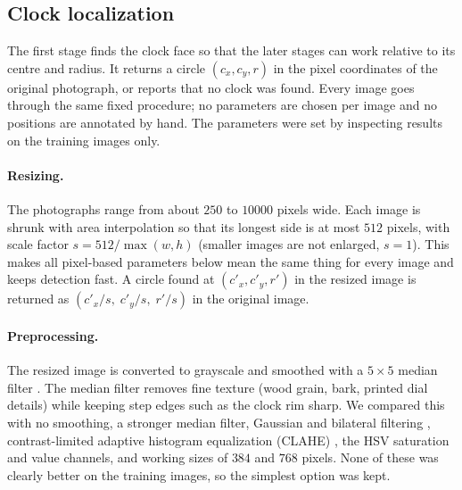 
\subsection{Clock localization}
\label{sec:localization}

The first stage finds the clock face so that the later stages can work
relative to its centre and radius. It returns a circle $(c_x, c_y, r)$ in the
pixel coordinates of the original photograph, or reports that no clock was
found. Every image goes through the same fixed procedure; no parameters are
chosen per image and no positions are annotated by hand. The parameters were
set by inspecting results on the training images only.

\paragraph{Resizing.}
The photographs range from about $250$ to $10000$ pixels wide. Each image is
shrunk with area interpolation so that its longest side is at most $512$
pixels, with scale factor $s = 512 / \max(w, h)$ (smaller images are not
enlarged, $s = 1$). This makes all pixel-based parameters below mean the same
thing for every image and keeps detection fast. A circle found at
$(c'_x, c'_y, r')$ in the resized image is returned as
$(c'_x / s,\; c'_y / s,\; r' / s)$ in the original image.

\paragraph{Preprocessing.}
The resized image is converted to grayscale and smoothed with a $5 \times 5$
median filter \citep{huang1979median}. The median filter removes fine texture
(wood grain, bark, printed dial details) while keeping step edges such as the
clock rim sharp. We compared this with no smoothing, a stronger median filter,
Gaussian and bilateral filtering \citep{tomasi1998bilateral}, contrast-limited
adaptive histogram equalization (CLAHE) \citep{zuiderveld1994clahe}, the HSV
saturation and value channels, and working sizes of $384$ and $768$ pixels.
None of these was clearly better on the training images, so the simplest
option was kept.

